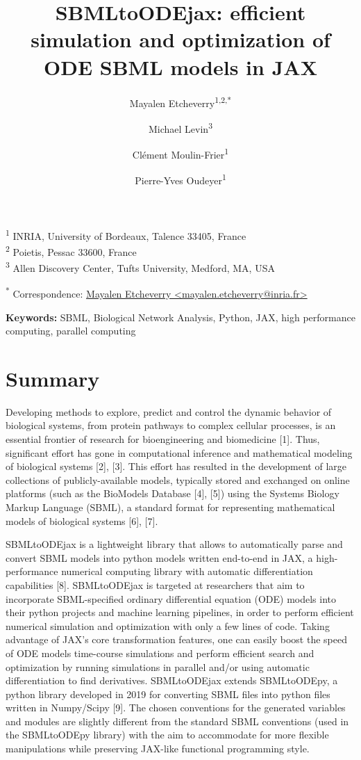 \documentclass[
]{article}
\title{SBMLtoODEjax: efficient simulation and optimization of ODE SBML
models in JAX}
\author{Mayalen Etcheverry\textsuperscript{1,2,*} \and Michael Levin\textsuperscript{3} \and Clément Moulin-Frier\textsuperscript{1} \and Pierre-Yves Oudeyer\textsuperscript{1}}
\date{}
\begin{document}
\maketitle

\textsuperscript{1} INRIA, University of Bordeaux, Talence 33405,
France\\
\textsuperscript{2} Poietis, Pessac 33600, France\\
\textsuperscript{3} Allen Discovery Center, Tufts University, Medford,
MA, USA

\textsuperscript{*} Correspondence:
\href{mailto:mayalen.etcheverry@inria.fr}{Mayalen Etcheverry
\textless{}mayalen.etcheverry@inria.fr\textgreater{}}

\textbf{Keywords:} SBML, Biological Network Analysis, Python, JAX, high
performance computing, parallel computing

\hypertarget{summary}{%
\section{Summary}\label{summary}}

Developing methods to explore, predict and control the dynamic behavior
of biological systems, from protein pathways to complex cellular
processes, is an essential frontier of research for bioengineering and
biomedicine {[}1{]}. Thus, significant effort has gone in computational
inference and mathematical modeling of biological systems {[}2{]},
{[}3{]}. This effort has resulted in the development of large
collections of publicly-available models, typically stored and exchanged
on online platforms (such as the BioModels Database {[}4{]}, {[}5{]})
using the Systems Biology Markup Language (SBML), a standard format for
representing mathematical models of biological systems {[}6{]}, {[}7{]}.

SBMLtoODEjax is a lightweight library that allows to automatically parse
and convert SBML models into python models written end-to-end in JAX, a
high-performance numerical computing library with automatic
differentiation capabilities {[}8{]}. SBMLtoODEjax is targeted at
researchers that aim to incorporate SBML-specified ordinary differential
equation (ODE) models into their python projects and machine learning
pipelines, in order to perform efficient numerical simulation and
optimization with only a few lines of code. Taking advantage of JAX's
core transformation features, one can easily boost the speed of ODE
models time-course simulations and perform efficient search and
optimization by running simulations in parallel and/or using automatic
differentiation to find derivatives. SBMLtoODEjax extends SBMLtoODEpy, a
python library developed in 2019 for converting SBML files into python
files written in Numpy/Scipy {[}9{]}. The chosen conventions for the
generated variables and modules are slightly different from the standard
SBML conventions (used in the SBMLtoODEpy library) with the aim to
accommodate for more flexible manipulations while preserving JAX-like
functional programming style.
\end{document}
